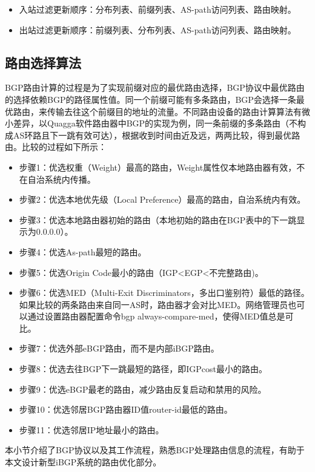 \begin{itemize}
\item 入站过滤更新顺序：分布列表、前缀列表、AS-path访问列表、路由映射。
\item 出站过滤更新顺序：前缀列表、分布列表、AS-path访问列表、路由映射。
\end{itemize}

\subsection{路由选择算法}
\label{subsec:calculation}
BGP路由计算\cite{DianeTeare2016CCNP}的过程是为了实现前缀对应的最优路由选择，BGP协议中最优路由的选择依赖BGP的路径属性值。同一个前缀可能有多条路由，BGP会选择一条最优路由，来传输去往这个前缀目的地址的流量。不同路由设备的路由计算算法有微小差异，以Quagga软件路由器中BGP的实现为例，同一条前缀的多条路由（不构成AS环路且下一跳有效可达），根据收到时间由近及远，两两比较，得到最优路由。比较的过程如下所示：

\begin{itemize}
    \item 步骤1：优选权重（Weight）最高的路由，Weight属性仅本地路由器有效，不在自治系统内传播。
    \item 步骤2：优选本地优先级（Local Preference）最高的路由，自治系统内有效。
    \item 步骤3：优选本地路由器初始的路由（本地初始的路由在BGP表中的下一跳显示为0.0.0.0）。
    \item 步骤4：优选As-path最短的路由。
    \item 步骤5：优选Origin Code最小的路由（IGP<EGP<不完整路由)。
    \item 步骤6：优选MED（Multi-Exit Discriminators，多出口鉴别符）最低的路径。如果比较的两条路由来自同一AS时，路由器才会对比MED。网络管理员也可以通过设置路由器配置命令bgp always-compare-med，使得MED值总是可比。
    \item 步骤7：优选外部eBGP路由，而不是内部iBGP路由。
    \item 步骤8：优选去往BGP下一跳最短的路径，即IGPcost最小的路由。
    \item 步骤9：优选eBGP最老的路由，减少路由反复启动和禁用的风险。
    \item 步骤10：优选邻居BGP路由器ID值router-id最低的路由。
    \item 步骤11：优选邻居IP地址最小的路由。\\
\end{itemize}

本小节介绍了BGP协议以及其工作流程，熟悉BGP处理路由信息的流程，有助于本文设计新型iBGP系统的路由优化部分。

